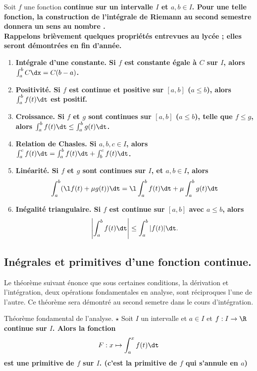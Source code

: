 \documentclass[11pt]{article}
\begin{document}
Soit $f$ une fonction \bf{continue} sur un intervalle $I$ et $a,b\in I$. Pour une telle fonction, la construction de l'intégrale de Riemann au second semestre donnera un sens au nombre .\\
Rappelons brièvement quelques propriétés entrevues au lycée ; elles seront démontrées en fin d'année.
\begin{enumerate}
    \item \bf{Intégrale d'une constante.} Si $f$ est constante égale à $C$ sur $I$, alors $\int_a^bC\dx=C(b-a)$.
    \item \bf{Positivité.} Si $f$ est \bf{continue} et \bf{positive} sur $[a,b]$ ($a\leq b$), alors $\int_a^bf(t)\dt$ est positif.
    \item \bf{Croissance.} Si $f$ et $g$ sont continues sur $[a,b]$ ($a\leq b$), telle que $f\leq g$, alors $\int_a^bf(t)\dt\leq\int_a^bg(t)\dt$.
    \item \bf{Relation de Chasles}. Si $a,b,c\in I$, alors $\int_a^cf(t)\dt=\int_a^bf(t)\dt+\int_b^cf(t)\dt$.
    \item \bf{Linéarité.} Si $f$ et $g$ sont continues sur $I$, et $a,b\in I$, alors
    \begin{equation*}
        \int_a^b(\l f(t)+\mu g(t))\dt=\l \int_a^bf(t)\dt+\mu \int_a^bg(t)\dt
    \end{equation*}
    \item \bf{Inégalité triangulaire.} Si $f$ est continue sur $[a,b]$ avec $a\leq b$, alors
    \begin{equation*}
        \left| \int_a^bf(t)\dt \right| \leq \int_a^b|f(t)|\dt.
    \end{equation*} 
\end{enumerate}

\pagebreak

\subsection{Inégrales et primitives d'une fonction continue.}

Le théorème suivant énonce que sous certaines conditions, la dérivation et l'intégration, deux opérations fondamentales en analyse, sont réciproques l'une de l'autre. Ce théorème sera démontré au second semetre dans le cours d'intégration.

\begin{thm}{Théorème fondamental de l'analyse. $\star$}{}
    Soit $I$ un intervalle et $a\in I$ et $f:I\to\R$ \bf{continue} sur $I$. Alors la fonction
    \begin{equation*}
        F:x\mapsto \int_a^xf(t)\dt
    \end{equation*}
    est une primitive de $f$ sur $I$. (c'est la primitive de $f$ qui s'annule en $a$)
\end{thm}
\end{document}

